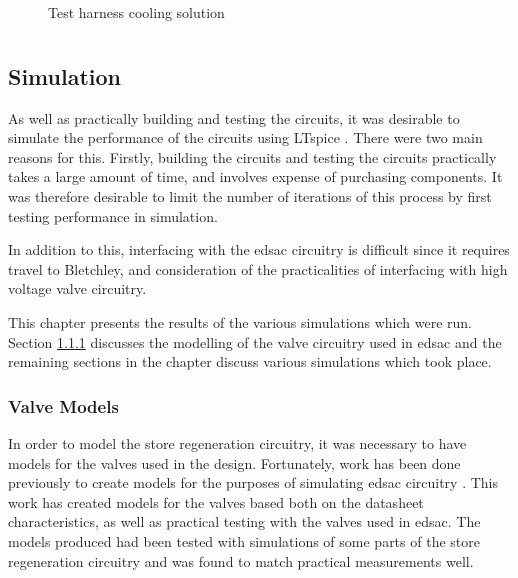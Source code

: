 \begin{figure}[ht]
	\centering
	\caption{Test harness cooling solution}
	\label{fig:test-harness-heatsink}
\end{figure}


\chapter{} \label{sec:verification}

\section{ Simulation}
As well as practically building and testing the circuits, it was desirable to simulate the performance of the circuits using LTspice \cite{linear2017}. There were two main reasons for this. Firstly, building the circuits and testing the circuits practically takes a large amount of time, and involves expense of purchasing components. It was therefore desirable to limit the number of iterations of this process by first testing performance in simulation.

In addition to this, interfacing with the \gls{edsac} circuitry is difficult since it requires travel to Bletchley, and consideration of the practicalities of interfacing with high voltage valve circuitry.

This chapter presents the results of the various simulations which were run. Section \ref{sec:spice-valve-models} discusses the modelling of the valve circuitry used in \gls{edsac} and the remaining sections in the chapter discuss various simulations which took place.

\subsection{Valve Models} \label{sec:spice-valve-models}

In order to model the store regeneration circuitry, it was necessary to have models for the valves used in the design. Fortunately, work has been done previously to create models for the purposes of simulating \gls{edsac} circuitry \cite{linnington2015}. This work has created models for the valves based both on the datasheet characteristics, as well as practical testing with the valves used in \gls{edsac}. The models produced had been tested with simulations of some parts of the store regeneration circuitry and was found to match practical measurements well.


